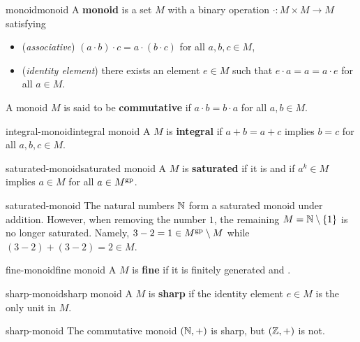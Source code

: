 \begin{topic}{monoid}{monoid}
    A \textbf{monoid} is a set $M$ with a binary operation $\cdot : M \times M \to M$ satisfying
    \begin{itemize}
        \item (\textit{associative}) $(a \cdot b) \cdot c = a \cdot (b \cdot c)$ for all $a, b, c \in M$,
        \item (\textit{identity element}) there exists an element $e \in M$ such that $e \cdot a = a = a \cdot e$ for all $a \in M$.
    \end{itemize}
    A monoid $M$ is said to be \textbf{commutative} if $a \cdot b = b \cdot a$ for all $a, b \in M$.
\end{topic}

\begin{topic}{integral-monoid}{integral monoid}
    A  $M$ is \textbf{integral} if $a + b = a + c$ implies $b = c$ for all $a, b, c \in M$.
\end{topic}

\begin{topic}{saturated-monoid}{saturated monoid}
    A  $M$ is \textbf{saturated} if it is  and if $a^k \in M$ implies $a \in M$ for all $a \in M^\textup{gp}$.
\end{topic}

\begin{example}{saturated-monoid}
    The natural numbers $\mathbb{N}$ form a saturated monoid under addition. However, when removing the number $1$, the remaining $M = \mathbb{N} \setminus \{ 1 \}$ is no longer saturated. Namely, $3 - 2 = 1 \in M^\textup{gp} \setminus M$ while $(3 - 2) + (3 - 2) = 2 \in M$.
\end{example}

\begin{topic}{fine-monoid}{fine monoid}
    A  $M$ is \textbf{fine} if it is finitely generated and .
\end{topic}

\begin{topic}{sharp-monoid}{sharp monoid}
    A  $M$ is \textbf{sharp} if the identity element $e \in M$ is the only unit in $M$.
\end{topic}

\begin{example}{sharp-monoid}
    The commutative monoid $(\mathbb{N}, +)$ is sharp, but $(\mathbb{Z}, +)$ is not.
\end{example}

